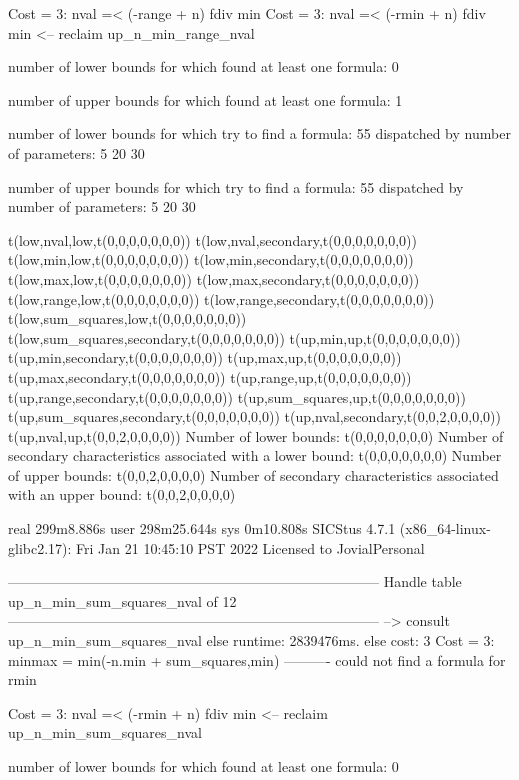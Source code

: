 Cost =  3:  nval =< (-range + n) fdiv min %
Cost =  3:  nval =< (-rmin + n) fdiv min
<-- reclaim up_n_min_range_nval

number of lower bounds for which found at least one formula: 0

number of upper bounds for which found at least one formula: 1

number of lower bounds for which try to find a formula: 55
dispatched by number of parameters: 5  20  30

number of upper bounds for which try to find a formula: 55
dispatched by number of parameters: 5  20  30

t(low,nval,low,t(0,0,0,0,0,0,0))
t(low,nval,secondary,t(0,0,0,0,0,0,0))
t(low,min,low,t(0,0,0,0,0,0,0))
t(low,min,secondary,t(0,0,0,0,0,0,0))
t(low,max,low,t(0,0,0,0,0,0,0))
t(low,max,secondary,t(0,0,0,0,0,0,0))
t(low,range,low,t(0,0,0,0,0,0,0))
t(low,range,secondary,t(0,0,0,0,0,0,0))
t(low,sum_squares,low,t(0,0,0,0,0,0,0))
t(low,sum_squares,secondary,t(0,0,0,0,0,0,0))
t(up,min,up,t(0,0,0,0,0,0,0))
t(up,min,secondary,t(0,0,0,0,0,0,0))
t(up,max,up,t(0,0,0,0,0,0,0))
t(up,max,secondary,t(0,0,0,0,0,0,0))
t(up,range,up,t(0,0,0,0,0,0,0))
t(up,range,secondary,t(0,0,0,0,0,0,0))
t(up,sum_squares,up,t(0,0,0,0,0,0,0))
t(up,sum_squares,secondary,t(0,0,0,0,0,0,0))
t(up,nval,secondary,t(0,0,2,0,0,0,0))
t(up,nval,up,t(0,0,2,0,0,0,0))
Number of lower bounds:                                             t(0,0,0,0,0,0,0)
Number of secondary characteristics associated with a lower bound:  t(0,0,0,0,0,0,0)
Number of upper bounds:                                             t(0,0,2,0,0,0,0)
Number of secondary characteristics associated with an upper bound: t(0,0,2,0,0,0,0)

real	299m8.886s
user	298m25.644s
sys	0m10.808s
SICStus 4.7.1 (x86_64-linux-glibc2.17): Fri Jan 21 10:45:10 PST 2022
Licensed to JovialPersonal


--------------------------------------------------------------------------------
Handle table up_n_min_sum_squares_nval of 12
--------------------------------------------------------------------------------
--> consult up_n_min_sum_squares_nval
else runtime: 2839476ms. else cost: 3
Cost =  3:  minmax = min(-n.min + sum_squares,min) %
----------
could not find a formula for rmin

Cost =  3:  nval =< (-rmin + n) fdiv min %
<-- reclaim up_n_min_sum_squares_nval

number of lower bounds for which found at least one formula: 0

